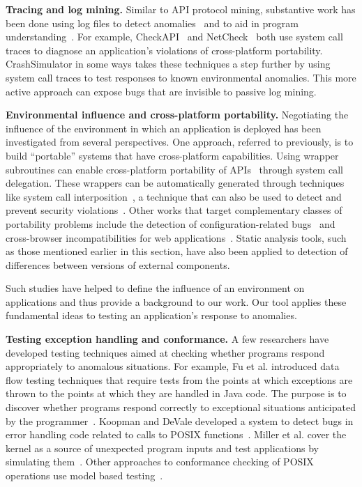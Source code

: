 \noindent
{\bf Tracing and log mining.}
Similar to API protocol mining, substantive work has been done using
log files to detect anomalies~\cite{pinpoint,
jiang_abnormal_trace_detection_icac_2005, xu2009detecting, lou2010mining2}
and to aid in program understanding~\cite{yuan2010sherlog,
beschastnikh_synoptic_fse_2011, csight_icse_2014}.
For example, CheckAPI~\cite{rasley2015detecting}
and NetCheck~\cite{Zhuang_NSDI_2014} both
use system call traces to diagnose an application's violations of
cross-platform portability.  CrashSimulator in some ways takes these
techniques a step further by using
system call traces
to test responses to known environmental anomalies.
This more active approach can expose bugs that
are invisible to passive log mining.


\noindent
{\bf Environmental influence and cross-platform portability.}
Negotiating the influence of the environment in which an
application is deployed has been investigated from several
perspectives. One approach, referred to previously,
is to build ``portable'' systems
that have cross-platform capabilities.
Using wrapper subroutines
can enable cross-platform portability
of APIs~\cite{bartolomeicompliance} through system call delegation.
These wrappers can be automatically generated through techniques like
system call interposition~\cite{Guo:2011:CUS:2002181.2002202}, a
technique that can also be used to detect and prevent security
violations~\cite{Hofmeyr:1998:IDU:1298081.1298084,
Acharya:2000:MUP:1251306.1251307}.
Other works that target complementary classes of portability problems
include the detection of configuration-related bugs~\cite{skoll:icse:2004,
Yilmaz:issta:2004, Fouche:issta:2009, Kastner12, Nguyen14} and
cross-browser incompatibilities for web
applications~\cite{DBLP:conf/icsm/ChoudharyVO10, silakov2010improving,
DBLP:conf/icse/Choudhary11, Mesbah:2011:ACC:1985793.1985870,
DBLP:conf/icst/DallmeierP0MZ14}.  Static analysis tools, such as those
mentioned earlier in this section, have also been applied to
detection of differences between versions of external components.

Such studies have helped to define the influence of an environment on
applications and thus provide a background to our work.  Our tool applies
these fundamental ideas to testing an application's response to anomalies.

\noindent
{\bf Testing exception handling and conformance.}
A few researchers have developed testing techniques aimed at checking
whether programs respond appropriately to anomalous situations.  For
example, Fu et al. introduced data flow testing techniques that require
tests from the points at which exceptions are thrown to the points
at which they are handled in Java code. The purpose is to discover whether
programs respond correctly to exceptional situations anticipated by the
programmer~\cite{DBLP:journals/tse/FuMRW05}.  Koopman and DeVale developed
a system to detect bugs in error handling code related to calls to POSIX
functions~\cite{Koopman00theexception}.  Miller et al. cover the kernel as
a source of unexpected program inputs and test applications by simulating
them~\cite{murphyslaw}.
Other approaches to conformance checking of POSIX operations use model
based testing~\cite{Dadeau:2008:CSM:1433121.1433137,Farchi02}.

